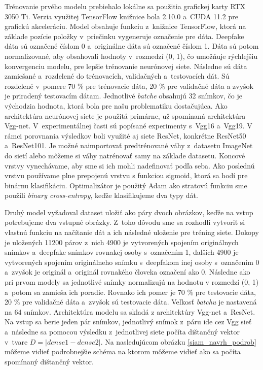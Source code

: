 Trénovanie prvého modelu prebiehalo lokálne sa použitia grafickej karty RTX 3050 Ti. Verzia využitej TensorFlow knižnice bola 2.10.0 a~CUDA 11.2 pre grafickú akceleráciu. Model obsahuje funkciu z~knižnice TensorFlow, ktorá na základe pozície položky v~priečinku vygeneruje označenie pre dáta. Deepfake dáta sú označené číslom 0 a~originálne dáta sú označené číslom 1. Dáta sú potom normalizované, aby obsahovali hodnoty v~rozmedzí (0, 1), čo umožňuje rýchlejšiu konvergenciu modelu, pre lepšie trénovanie neurónovej siete. Následne sú dáta zamiešané a~rozdelené do trénovacích, validačných a~testovacích dát. Sú rozdelené v~pomere 70 \% pre trénovacie dáta, 20 \% pre validačné dáta a zvyšok je priradený testovacím dátam. Jednotlivé \textit{batche} obsahujú 32 snímkov, čo je východzia hodnota, ktorá bola pre našu problematiku dostačujúca. Ako architektúra neurónovej siete je použitá primárne, už spomínaná architektúra Vgg-net. V~experimentálnej časti sú popísané experimenty s~Vgg16 a~Vgg19. V rámci porovnania výsledkov boli využité aj siete ResNet, konkrétne ResNet50 a~ResNet101. Je možné naimportovať predtrénované váhy z~datasetu ImageNet do sietí alebo môžeme si váhy natrénovať samy na základe datasetu. Koncové vrstvy vynechávame, aby sme si ich mohli nadefinovať podľa seba. Ako poslednú vrstvu používame plne prepojenú vrstvu s funkciou sigmoid, ktorá sa hodí pre binárnu klasifikáciu. Optimalizátor je použitý Adam \cite{adam_opt} ako stratovú funkciu sme použili \textit{binary cross-entropy}, keďže klasifikujeme dva typy dát. 

Druhý model vyžadoval dataset uložiť ako páry dvoch obrázkov, keďže na vstup potrebujeme dva vstupné obrázky. Z~toho dôvodu sme sa rozhodli vytvoriť si vlastnú funkciu na načítanie dát a ich následné uloženie pre tréning siete. Dokopy je uložených 11200 párov z~nich 4900 je vytvorených spojením originálnych snímkov a~deepfake snímkov rovnakej osoby s~označením 1, ďalších 4900 je vytvorených spojením originálneho snímku s~deepfakom inej osoby s~označením 0 a~zvyšok je originál a~originál rovnakého človeka označení ako 0. Následne ako pri prvom modely sa jednotlivé snímky normalizujú na hodnotu v rozmedzí (0, 1) a~potom sa zamieša ich poradie. Rovnako ich pomer je 70 \% pre testovacie dáta, 20 \% pre validačné dáta a~zvyšok sú testovacie dáta. Veľkosť \textit{batchu} je nastavená na 64 snímkov. Architektúra modelu sa skladá z architektúry Vgg-net a~ResNet. Na vstup sa berie jeden pár snímkov, jednotlivý snímok z~páru ide cez Vgg sieť a~následne sa pomocou výsledku z~jednotlivej siete počíta dištančný vektor v~tvare $D = | dense1 - dense2 |$. Na nasledujúcom obrázku \ref{siam_navrh_podrob} môžeme vidieť podrobnejšie schéma na ktorom môžeme vidieť ako sa počíta spomínaný dištančný vektor.

